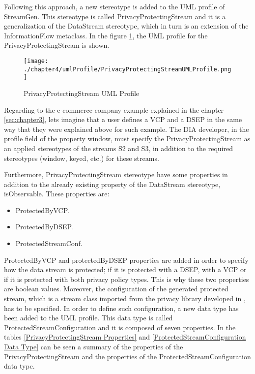 Following this approach, a new stereotype is added to the UML profile of StreamGen. This stereotype is called PrivacyProtectingStream and it is a generalization of the DataStream stereotype, which in turn is an extension of the InformationFlow metaclass. In the figure \ref{fig:PrivacyProtectingStream UML Profile}, the UML profile for the PrivacyProtectingStream is shown.

\begin{figure}
\centering
{\texttt{[image: ./chapter4/umlProfile/PrivacyProtectingStreamUMLProfile.png]}}
\caption{PrivacyProtectingStream UML Profile}
\label{fig:PrivacyProtectingStream UML Profile}
\end{figure}

Regarding to the e-commerce company example explained in the chapter \ref{sec:chapter3}, lets imagine that a user defines a VCP and a DSEP in the same way that they were explained above for such example. The DIA developer, in the profile field of the property window, must specify the PrivacyProtectingStream as an applied stereotypes of the streams S2 and S3, in addition to the required stereotypes (window, keyed, etc.) for these streams. 

Furthermore, PrivacyProtectingStream stereotype have some properties in addition to the already existing property of the DataStream stereotype, isObservable. These properties are:

\begin{itemize}
\item ProtectedByVCP.
\item ProtectedByDSEP.
\item ProtectedStreamConf.
\end{itemize}

ProtectedByVCP and protectedByDSEP properties are added in order to specify how the data stream is protected; if it is protected with a DSEP, with a VCP or if it is protected with both privacy policy types. This is why these two properties are boolean values. Moreover, the configuration of the generated protected stream, which is a stream class imported from the privacy library developed in \cite{privacypoliciesarticle}, has to be specified. In order to define such configuration, a new data type has been added to the UML profile. This data type is called ProtectedStreamConfiguration and it is composed of seven properties. In the tables \ref{PrivacyProtectingStream Properties} and \ref{ProtectedStreamConfiguration Data Type} can be seen a summary of the properties of the PrivacyProtectingStream and the properties of the ProtectedStreamConfiguration data type.

